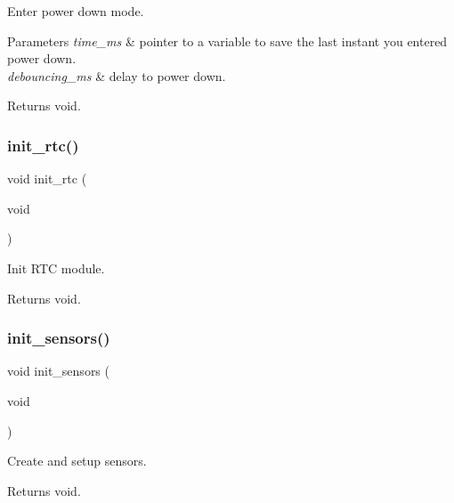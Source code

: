 Enter power down mode. 


\begin{DoxyParams}{Parameters}
{\em time\+\_\+ms} & pointer to a variable to save the last instant you entered power down. \\
\hline
{\em debouncing\+\_\+ms} & delay to power down. \\
\hline
\end{DoxyParams}
\begin{DoxyReturn}{Returns}
void. 
\end{DoxyReturn}
\mbox{\label{rmap_8ino_ab985cc69f5f573113405b4f118c96d33}} 
\subsubsection{\texorpdfstring{init\+\_\+rtc()}{init\_rtc()}}
{\footnotesize\ttfamily void init\+\_\+rtc (\begin{DoxyParamCaption}\item[{void}]{ }\end{DoxyParamCaption})}



Init R\+TC module. 

\begin{DoxyReturn}{Returns}
void. 
\end{DoxyReturn}
\mbox{\label{rmap_8ino_ac74850003fab6eb3269bfe043d0f939c}} 
\subsubsection{\texorpdfstring{init\+\_\+sensors()}{init\_sensors()}}
{\footnotesize\ttfamily void init\+\_\+sensors (\begin{DoxyParamCaption}\item[{void}]{ }\end{DoxyParamCaption})}



Create and setup sensors. 

\begin{DoxyReturn}{Returns}
void. 
\end{DoxyReturn}
\mbox{\label{rmap_8ino_a8eb9780a3438ec02c70314744f91f3c7}} 
